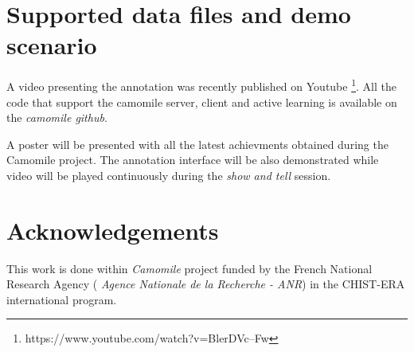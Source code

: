 \documentclass[a4paper]{article}
\begin{document}






        \vspace{-0.3cm}
  \section{Supported data files and demo scenario}
          \vspace{-0.1cm}

A video presenting the annotation was recently published on Youtube \footnote{https://www.youtube.com/watch?v=BlerDVc--Fw}. All the code that support the camomile server, client and active learning is available on the \textit{camomile github}.



A poster will be presented with all the latest achievments obtained during the Camomile project. The annotation interface will be also demonstrated while video will be played continuously during the \textit{show and tell} session. %

        \vspace{-0.3cm}
 \section{Acknowledgements}
  
    This work is done within \textit{Camomile} project funded by the French National Research Agency ( \textit{Agence Nationale de la Recherche - ANR}) in the CHIST-ERA international program.

  
  \eightpt
  
  
  
\end{document}
